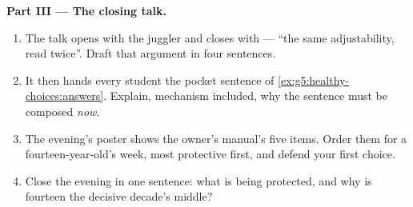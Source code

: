 \begin{problem}
\medskip\noindent\textbf{Part III --- The closing
talk.}
\begin{enumerate}[resume]
  \item The talk opens with the juggler and closes with
         --- ``the same adjustability, read
        twice''. Draft that argument in four sentences.
  \item It then hands every student the pocket sentence
        of \cref{ex:g5:healthy-choices:answers}. Explain,
        mechanism included, why the sentence must be
        composed \emph{now}.
  \item The evening's poster shows the owner's manual's
        five items. Order them for a fourteen-year-old's
        week, most protective first, and defend your
        first choice.
  \item Close the evening in one sentence: what is being
        protected, and why is fourteen the decisive
        decade's middle?
\end{enumerate}
\end{problem}
